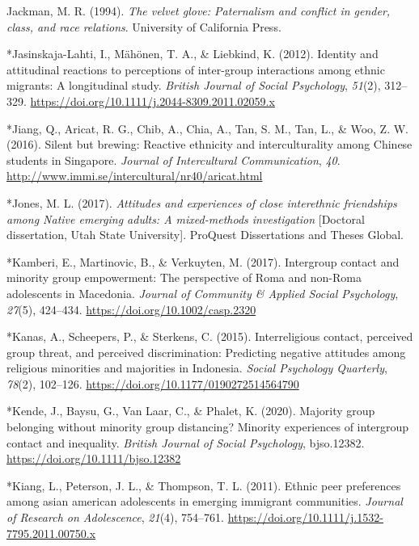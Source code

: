 \documentclass[12pt, letterpaper]{article}
\newenvironment{CSLReferences}[2]{}{}
\begin{document}
\begin{CSLReferences}{1}{0}
\leavevmode\hypertarget{ref-jackman_velvet_1994}{}%
Jackman, M. R. (1994). \emph{The velvet glove: Paternalism and conflict
in gender, class, and race relations}. University of California Press.

\leavevmode\hypertarget{ref-2341}{}%
*Jasinskaja-Lahti, I., Mähönen, T. A., \& Liebkind, K. (2012). Identity
and attitudinal reactions to perceptions of inter-group interactions
among ethnic migrants: A longitudinal study. \emph{British Journal of
Social Psychology}, \emph{51}(2), 312--329.
\url{https://doi.org/10.1111/j.2044-8309.2011.02059.x}

\leavevmode\hypertarget{ref-19}{}%
*Jiang, Q., Aricat, R. G., Chib, A., Chia, A., Tan, S. M., Tan, L., \&
Woo, Z. W. (2016). Silent but brewing: {Reactive} ethnicity and
interculturality among {Chinese} students in {Singapore}. \emph{Journal
of Intercultural Communication}, \emph{40}.
\url{http://www.immi.se/intercultural/nr40/aricat.html}

\leavevmode\hypertarget{ref-303}{}%
*Jones, M. L. (2017). \emph{Attitudes and experiences of close
interethnic friendships among {Native} emerging adults: {A}
mixed-methods investigation} {[}Doctoral dissertation, Utah State
University{]}. {ProQuest Dissertations and Theses Global}.

\leavevmode\hypertarget{ref-856}{}%
*Kamberi, E., Martinovic, B., \& Verkuyten, M. (2017). Intergroup
contact and minority group empowerment: {The} perspective of {Roma} and
non-{Roma} adolescents in {Macedonia}. \emph{Journal of Community \&
Applied Social Psychology}, \emph{27}(5), 424--434.
\url{https://doi.org/10.1002/casp.2320}

\leavevmode\hypertarget{ref-1411}{}%
*Kanas, A., Scheepers, P., \& Sterkens, C. (2015). Interreligious
contact, perceived group threat, and perceived discrimination:
Predicting negative attitudes among religious minorities and majorities
in {Indonesia}. \emph{Social Psychology Quarterly}, \emph{78}(2),
102--126. \url{https://doi.org/10.1177/0190272514564790}

\leavevmode\hypertarget{ref-4002}{}%
*Kende, J., Baysu, G., Van Laar, C., \& Phalet, K. (2020). Majority
group belonging without minority group distancing? {Minority}
experiences of intergroup contact and inequality. \emph{British Journal
of Social Psychology}, bjso.12382.
\url{https://doi.org/10.1111/bjso.12382}

\leavevmode\hypertarget{ref-1525}{}%
*Kiang, L., Peterson, J. L., \& Thompson, T. L. (2011). Ethnic peer
preferences among asian american adolescents in emerging immigrant
communities. \emph{Journal of Research on Adolescence}, \emph{21}(4),
754--761. \url{https://doi.org/10.1111/j.1532-7795.2011.00750.x}


\end{CSLReferences}
\end{document}
